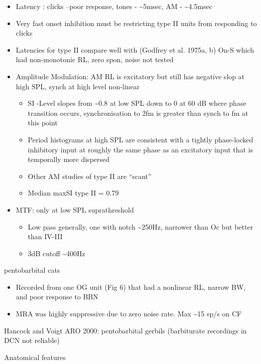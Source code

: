 \documentclass[10pt,a4paper]{article}
\begin{document}
\begin{itemize}
\item Latency : clicks --poor response, tones - \~{}5msec, AM - \~{}4.5msec
\item Very fast onset inhibition must be restricting type II units from
  responding to clicks
\item Latencies for type II compare well with (Godfrey et al. 1975a, b) On-S
  which had non-monotonic RL, zero spon, noise not tested
\item Amplitude Modulation: AM RL is excitatory but still has negative slop at
  high SPL, synch at high level non-linear

  \begin{itemize}
  \item SI -Level slopes from \~{}0.8 at low SPL down to 0 at 60 dB where phase
    transition occurs, synchronisation to 2fm is greater than synch to fm at
    this point
  \item Period histograms at high SPL are consistent with a tightly phase-locked
    inhibitory input at roughly the same phase as an excitatory input that is
    temporally more dispersed
  \item Other AM studies of type II are
    {\textquotedblleft}scant{\textquotedblright}
    \citep{KimSirianniEtAl:1990,ZhaoLiang:1995}
  \item Median maxSI type II = 0.79
  \end{itemize}
\item MTF: only at low SPL suprathreshold

  \begin{itemize}
  \item Low pass generally, one with notch \~{}250Hz, narrower than Oc but
    better than IV-III
  \item 3dB cutoff \~{}400Hz
  \end{itemize}
\end{itemize}
\citep{RhodeGreenberg:1994b} pentobarbital cats


\begin{itemize}
\item Recorded from one OG unit (Fig 6) that had a nonlinear RL, narrow BW, and
  poor response to BBN
\item MRA was highly suppressive due to zero noise rate. Max \~{}15 sp/s on CF
\end{itemize}
Hancock and Voigt ARO 2000: pentobarbital gerbils (barbiturate recordings in DCN
not reliable)

Anatomical features
\end{document}
